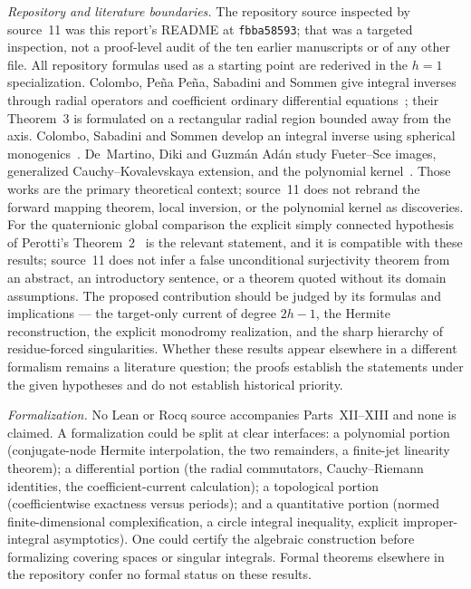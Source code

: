\documentclass[11pt,a4paper]{article}
\numberwithin{equation}{section}
\theoremstyle{definition}
\theoremstyle{remark}
\theoremstyle{plain}
\begin{document}
\emph{Repository and literature boundaries.} The repository source inspected
by source~11 was this report's README at \texttt{fbba58593}; that was a
targeted inspection, not a proof-level audit of the ten earlier manuscripts or
of any other file. All repository formulas used as a starting point are
rederived in the $h=1$ specialization. Colombo, Pe\~na Pe\~na, Sabadini and
Sommen give integral inverses through radial operators and coefficient
ordinary differential equations~\cite{CPSS}; their Theorem~3 is formulated on
a rectangular radial region bounded away from the axis. Colombo, Sabadini and
Sommen develop an integral inverse using spherical monogenics~\cite{CSS13}.
De~Martino, Diki and Guzm\'an Ad\'an study Fueter--Sce images, generalized
Cauchy--Kovalevskaya extension, and the polynomial kernel~\cite{DDG}. Those
works are the primary theoretical context; source~11 does not rebrand the
forward mapping theorem, local inversion, or the polynomial kernel as
discoveries. For the quaternionic global comparison the explicit simply
connected hypothesis of Perotti's Theorem~2~\cite{Perottib} is the relevant
statement, and it is compatible with these results; source~11 does not infer
a false unconditional surjectivity theorem from an abstract, an introductory
sentence, or a theorem quoted without its domain assumptions. The proposed
contribution should be judged by its formulas and implications --- the
target-only current of degree $2h-1$, the Hermite reconstruction, the explicit
monodromy realization, and the sharp hierarchy of residue-forced
singularities. Whether these results appear elsewhere in a different
formalism remains a literature question; the proofs establish the statements
under the given hypotheses and do not establish historical priority.

\emph{Formalization.} No Lean or Rocq source accompanies Parts~XII--XIII and
none is claimed. A formalization could be split at clear interfaces: a
polynomial portion (conjugate-node Hermite interpolation, the two remainders,
a finite-jet linearity theorem); a differential portion (the radial
commutators, Cauchy--Riemann identities, the coefficient-current
calculation); a topological portion (coefficientwise exactness versus
periods); and a quantitative portion (normed finite-dimensional
complexification, a circle integral inequality, explicit improper-integral
asymptotics). One could certify the algebraic construction before
formalizing covering spaces or singular integrals. Formal theorems elsewhere
in the repository confer no formal status on these results.
\end{document}
